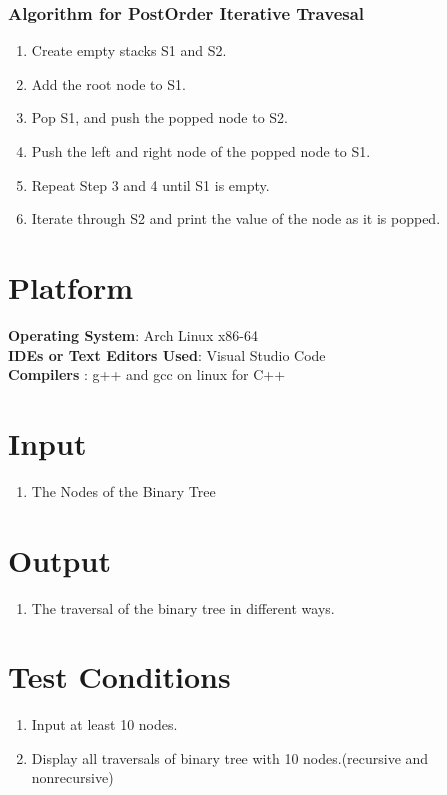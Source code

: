 \documentclass[11pt]{article}
\begin{document}
\subsubsection{Algorithm for PostOrder Iterative Travesal}
\begin{enumerate}
    \item Create empty stacks S1 and S2.
    \item Add the root node to S1. 
    \item Pop S1, and push the popped node to S2.
    \item Push the left and right node of the popped node to S1. 
    \item Repeat Step 3 and 4 until S1 is empty.
    \item Iterate through S2 and print the value of the node as it is popped.
\end{enumerate}



\section{Platform}
\textbf{Operating System}: Arch Linux x86-64 \\
\textbf{IDEs or Text Editors Used}: Visual Studio Code\\
\textbf{Compilers} : g++ and gcc on linux for C++\\

\section{Input}
\begin{enumerate}
	\item The Nodes of the Binary Tree
\end{enumerate}
\section{Output}
\begin{enumerate}
	\item The traversal of the binary tree in different ways.
\end{enumerate}

\section{Test Conditions}
\begin{enumerate}
	\item Input at least 10 nodes.
    \item Display all traversals of binary tree with 10 nodes.(recursive and nonrecursive)
\end{enumerate}
\end{document}
